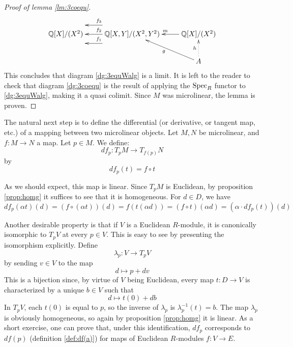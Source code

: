 \begin{proof}[Proof of lemma \ref{lm:3coequ}]
  \begin{equation*}
    \xymatrix{
      \Q[X]/(X^2) & \Q[X,Y]/(X^2,Y^2) \ar@<3ex>[l]_{f_1} \ar[l]_{f_2} \ar@<-3ex>[l]_{f_3} & \Q[X]/(X^2) \ar[l]_{m} \\
      &                                                                                   & A \ar[lu]^g \ar@{.>}[u]^h
    }
  \end{equation*}
  This concludes that diagram \ref{dg:3equWalg} is a limit. It is left to the reader to check that diagram \ref{dg:3coequ} is the result of applying the \( \operatorname{Spec}_R \) functor to \ref{dg:3equWalg}, making it a quasi colimit. Since \( M \) was microlinear, the lemma is proven.
\end{proof}

The natural next step is to define the differential (or derivative, or tangent map, etc.) of a mapping between two microlinear objects. Let \( M,N \) be microlinear, and \( f:M\to N \) a map. Let \( p\in M \). We define:
\begin{equation*}
  df_p : T_pM\to T_{f(p)}N
\end{equation*}
by
\begin{equation*}
  df_p(t) = f\circ t
\end{equation*}

As we should expect, this map is linear. Since \( T_pM \) is Euclidean, by proposition \ref{prop:homg} it suffices to see that it is homogeneous. For \( d\in D \), we have
\begin{equation*} 
  df_p(\alpha t)(d) = (f\circ (\alpha t))(d) = f(t(\alpha d)) = (f\circ t)(\alpha d) = (\alpha \cdot df_p(t))(d)
\end{equation*}

Another desirable property is that if \( V \) is a Euclidean \( R \)-module, it is canonically isomorphic to \( T_pV \) at every \( p\in V \). This is easy to see by presenting the isomorphism explicitly. Define
\begin{equation*}
  \lambda_p:V\to T_pV
\end{equation*}
by sending \( v\in V \) to the map
\begin{equation*}
  d\mapsto p+dv
\end{equation*}
This is a bijection since, by virtue of \( V \) being Euclidean, every map \( t:D\to V \) is characterized by a unique \( b\in V \) such that
\begin{equation*}
  d\mapsto t(0)+db
\end{equation*}
In \( T_pV \), each \( t(0) \) is equal to \( p \), so the inverse of \( \lambda_p \) is \( \lambda_p^{-1}(t) = b \). The map \( \lambda_p \) is obviously homogeneous, so again by proposition \ref{prop:homg} it is linear. As a short exercise, one can prove that, under this identification, \( df_p \) corresponds to \( df(p) \) (definition \ref{def:df(a)}) for maps of Euclidean \( R \)-modules \( f:V\to E \).

